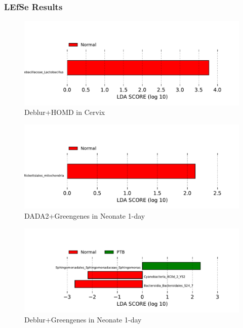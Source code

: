 \documentclass{beamer}
\begin{document}
    \begin{frame}[allowframebreaks]
        \frametitle{LEfSe Results}

        \begin{figure}
            \includegraphics[width=\linewidth]{figures/LEfSe/Default/everything.Deblur.homd.Cervix.pdf}
            \caption{Deblur+HOMD in Cervix}
        \end{figure}

        \begin{figure}
            \includegraphics[width=\linewidth]{figures/LEfSe/Default/everything.DADA2.gg.Neonate-1day.pdf}
            \caption{DADA2+Greengenes in Neonate 1-day}
        \end{figure}

        \begin{figure}
            \includegraphics[width=\linewidth]{figures/LEfSe/Default/everything.Deblur.gg.Neonate-1day.pdf}
            \caption{Deblur+Greengenes in Neonate 1-day}
        \end{figure}


\end{frame}
\end{document}
